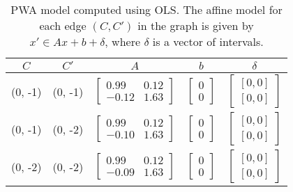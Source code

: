 \label{fig:vdp-cont}

\label{fig:vdp-abs}

\label{fig:vdp-map}

\label{fig:vdp-graph}

\begin{table*}[!htbp]
\centering
\caption{PWA model computed using OLS. The affine model for each edge $(C,C')$ in the graph  is given by $x'\in Ax + b + \delta$, where $\delta$ is a vector of intervals.}
\label{tab:vdp-pwa}
\begin{tabular}{@{}ccccc@{}}
\toprule
$C$ & $C'$ & $A$ & $b$ & $\delta$\\
\midrule
(0, -1)   & (0, -1)   & $\begin{bmatrix}0.99& 0.12 \\-0.12&1.63\end{bmatrix}$&$\begin{bmatrix}0\\0\end{bmatrix}  $&$\begin{bmatrix}[0, 0]\\ [0, 0]\end{bmatrix}$\\
(0, -1)   & (0, -2)   & $\begin{bmatrix}0.99& 0.12 \\-0.10&1.63\end{bmatrix}$&$\begin{bmatrix}0\\0\end{bmatrix}  $&$\begin{bmatrix}[0, 0]\\ [0, 0]\end{bmatrix}$\\
\midrule
(0, -2)   & (0, -2)   & $\begin{bmatrix}0.99& 0.12 \\-0.09&1.63\end{bmatrix}$&$\begin{bmatrix}0\\0\end{bmatrix}  $&$\begin{bmatrix}[0, 0]\\ [0, 0]\end{bmatrix}$\\

\end{tabular}
\end{table*}
